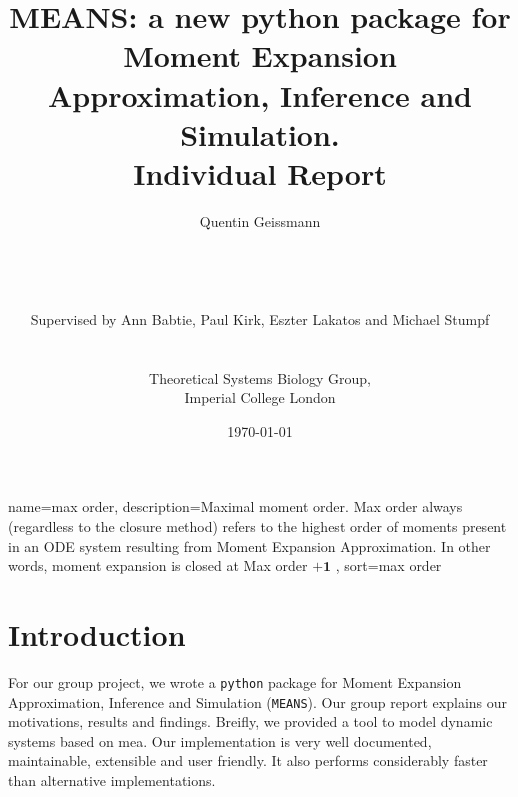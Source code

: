 \documentclass[11pt,a4paper]{article}
\newcommand{\means}{\texttt{MEANS}}
\newcommand{\py}{\texttt{python}}
\begin{document}
\listoftodos
\newpage

\title{MEANS: a new python package for Moment Expansion Approximation, Inference and Simulation.\\
Individual Report}
\author{Quentin Geissmann\\
\\	
\\
\\
\\
Supervised by Ann Babtie, Paul Kirk, Eszter Lakatos and Michael Stumpf\\
\\
\\
Theoretical Systems Biology Group,\\
Imperial College London
}
\date{\today}

\clearpage\maketitle
\thispagestyle{empty}
\newpage{}



\tableofcontents


{
  name=max order,
  description={Maximal moment order. Max order always (regardless to the closure method) refers to the highest order of 
  moments present in an ODE system resulting from Moment Expansion Approximation. In other words, moment expansion is closed at Max order $\mathbf{+1}$
   },
  sort=max order
}

\newpage{}

\section{Introduction}

For our group project, we wrote a \py{} package for Moment Expansion Approximation, Inference and Simulation (\means).
Our group report explains our motivations, results and findings. 
Breifly, we provided a tool to model dynamic systems based on \acrlong{mea}\cite{ale_general_2013}.
Our implementation is very well documented, maintainable, extensible and user friendly.
It also performs considerably faster than alternative implementations.
\end{document}
